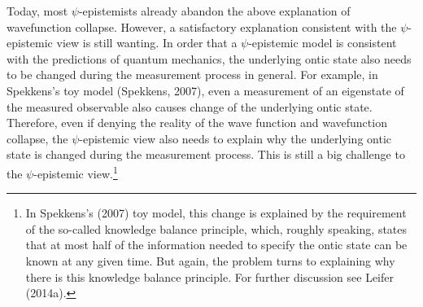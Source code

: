 Today, most $\psi$-epistemists already abandon the above explanation of wavefunction collapse. However, a satisfactory explanation consistent with the $\psi$-epistemic view is still wanting. 
In order that a $\psi$-epistemic model is consistent with the predictions of quantum mechanics, the underlying ontic state also needs to be changed during the measurement process in general. For example, in Spekkens's toy model (Spekkens, 2007), even a measurement of an eigenstate of the measured observable also causes change of the underlying ontic state. 
Therefore, even if denying the reality of the wave function and wavefunction collapse, the $\psi$-epistemic view also needs to explain why the underlying ontic state is changed during the measurement process. This is still a big challenge to the $\psi$-epistemic view.\footnote{In Spekkens's (2007) toy model, this change is explained by the requirement of the so-called knowledge balance principle, which, roughly speaking, states that at most half of the information needed to specify the ontic state can be known at any given time. But again, the problem turns to explaining why there is this knowledge balance principle. For further discussion see Leifer (2014a).}



